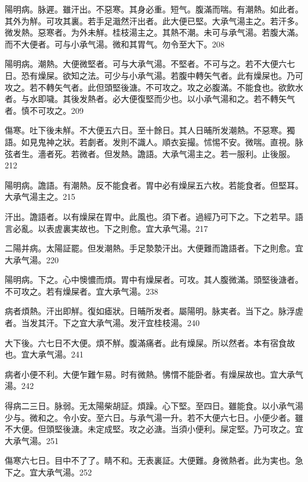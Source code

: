 \documentclass[12pt,twoside,UTF8,b5paper]{ctexbook}
\begin{document}
陽明病。脉遲。雖汗出。不惡寒。其身必重。短气。腹滿而喘。有潮熱。如此者。其外为觧。可攻其裏。若手足濈然汗出者。此大便已堅。{大}承气湯主之。若汗多。微发熱。惡寒者。为外未觧。{桂枝湯主之。}其熱不潮。未可与承气湯。若腹大滿。而不大便者。可与小承气湯。微和其胃气。勿令至大下。208

陽明病。潮熱。大便微堅者。可与{大}承气湯。不堅者。不可与之。若不大便六七日。恐有燥屎。欲知之法。可少与小承气湯。若腹中轉矢气者。此有燥屎也。乃可攻之。若不轉矢气者。此但頭堅後溏。不可攻之。攻之必腹滿。不能食也。欲飲水者。与水即噦。其後发熱者。必大便復堅而少也。以小承气湯和之。若不轉矢气者。慎不可攻之。209

傷寒。吐下後未觧。不大便五六日。至十餘日。其人日晡所发潮熱。不惡寒。獨語。如見鬼{神之}狀。若劇者。发則不識人。順衣妄撮。怵惕不安。微喘。直視。脉弦者生。濇者死。{若}微者。但发熱。譫語。{大}承气湯主之。若一服利。止後服。212

陽明病。譫語。有潮熱。反不能食者。{胃中}必有燥屎五六枚。若能食者。但堅耳。{大}承气湯主之。215

汗出。譫語者。以有燥屎在胃中。此風也。{須下者。}過經乃可下之。下之若早。語言必亂。以表虗裏実故也。下之則愈。宜{大}承气湯。217

二陽并病。太陽証罷。但发潮熱。手足漐漐汗出。大便難而譫語者。下之則愈。宜{大}承气湯。220

陽明病。下之。心中懊憹而煩。胃中有燥屎者。可攻。其人腹微滿。頭堅後溏者。不可攻之。若有燥屎者。宜{大}承气湯。238

病者煩熱。汗出即觧。復如瘧狀。日晡所发者。屬陽明。脉実者。当下之。脉浮虗者。当发其汗。下之宜{大}承气湯。发汗宜桂枝湯。240

大下後。六七日不大便。煩不觧。腹滿痛者。此有燥屎。所以然者。本有宿食故也。宜{大}承气湯。241

病者小便不利。大便乍難乍易。时有微熱。怫㥜不能卧者。有燥屎故也。宜{大}承气湯。242

得病二三日。脉弱。无太陽柴胡証。煩躁。心下堅。至四日。雖能食。以{小}承气湯少与。微和之。令小安。至六日。与承气湯一升。若不大便六七日。小便少者。雖不大便。但頭堅後溏。未定成堅。攻之必溏。当須小便利。屎定堅。乃可攻之。宜{大}承气湯。251

傷寒六七日。目中不了了。睛不和。无表裏証。大便難。身微熱者。此为実也。急下之。宜{大}承气湯。252
\end{document}
